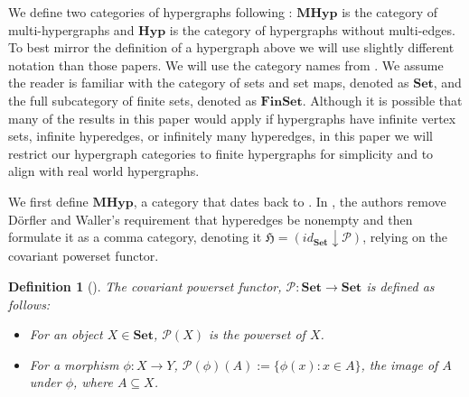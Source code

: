 \documentclass{amsart}
\newtheorem{definition}[theorem]{Definition}
\newcommand{\Set}{\mathrm{\textbf{Set}}}
\newcommand{\FinSet}{\mathrm{\textbf{FinSet}}}
\newcommand{\Ab}{\mathrm{\textbf{Ab}}}
\newcommand{\Hyp}{\mathrm{\textbf{Hyp}}}
\newcommand{\MHyp}{\mathrm{\textbf{MHyp}}}
\newcommand{\po}{\mathcal{P}}
\begin{document}
We define two categories of hypergraphs following
\cite{dorfler1980category,grilliette2023incidence,grilliette2020simplification,green2025topological}: $\MHyp$ is the category of multi-hypergraphs and $\Hyp$ is the category of hypergraphs without multi-edges.
To best mirror the definition of a hypergraph above we will use slightly different notation than those papers. We will use the category names from \cite{green2025topological}.
We assume the reader is familiar with the category of sets and set maps, denoted as $\Set$, and the full subcategory of finite sets, denoted as $\FinSet$.
Although it is possible that many of the results in this paper would apply if hypergraphs have infinite vertex sets, infinite hyperedges, or infinitely many hyperedges, in this paper we will restrict our hypergraph categories to finite hypergraphs for simplicity and to align with real world hypergraphs.

We first define $\MHyp$, a category that dates back to \cite{dorfler1980category}. In \cite{grilliette2023incidence}, the authors remove D\"{o}rfler and Waller's requirement that hyperedges be nonempty and then formulate it as a comma category, denoting it $\mathfrak{H}=(id_\Set \downarrow \po)$, relying on the covariant powerset functor.

\begin{definition}[{\cite[page 13]{mac2013categories}}]
    The \emph{covariant powerset functor}, $\po: \Set \rightarrow \Set$ is defined as follows:
    \begin{itemize}
        \item For an object $X \in \Set$, $\po(X)$ is the powerset of $X$.
        \item For a morphism $\phi : X \rightarrow Y$, $\po(\phi)(A) := \{\phi(x) : x \in A\}$, the image of $A$ under $\phi$, where $A \subseteq X$.
    \end{itemize}
\end{definition}
\end{document}
